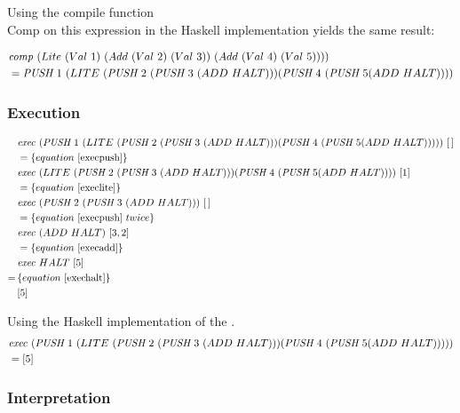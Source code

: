 \documentclass {article}
\begin{document}
Using the compile function \\Comp on this expression 
in the Haskell implementation yields the same result:

\begin{align*}	
&\Comp (Lite\ (Val\ 1)\
		 (Add\ (Val\ 2)\ (Val\ 3))\ 
		(Add\ (Val\ 4)\ (Val\ 5)))) \\
&= \PUSH 1\ (LITE\ 
		(\PUSH 2\ (\PUSH 3\ 
		(ADD\ HALT))) 
		(\PUSH 4\ (\PUSH 5 (ADD\ HALT))))
\end{align*}

\subsubsection{Execution}


\begin{align*}
&\Exec (\PUSH 1\ (LITE\ (\PUSH 2\ (\PUSH 3\ (ADD\ HALT))) (\PUSH 4\ (\PUSH 5 (ADD\ HALT)))))\ [\, ] \\
&=\{equation\ \ref{execpush} \} \\
&\Exec (LITE\ (\PUSH 2\ (\PUSH 3\ (ADD\ HALT))) (\PUSH 4\ (\PUSH 5 (ADD\ HALT))))\ [1] \\
&=\{equation\ \ref{execlite} \} \\
&\Exec (\PUSH 2\ (\PUSH 3\ (ADD\ HALT)))\ [\, ] \\
&=\{equation\ \ref{execpush}\ twice \} \\
&\Exec (ADD\ HALT)\ [3, 2] \\
&=\{equation\ \ref{execadd} \} \\
&\Exec HALT\ [5] \\
=\, & \{equation\ \ref{exechalt}\} \\
&[5]
\end{align*}

Using the Haskell implementation of the \vm.
\begin{align*}	
&\Exec (\PUSH 1\ (LITE\ 
	(\PUSH 2\ (\PUSH 3\ (ADD\ HALT))) 
	(\PUSH 4\ (\PUSH 5 (ADD\ HALT))))) \\
&= [5]
\end{align*}

\subsubsection{Interpretation}
\end{document}
